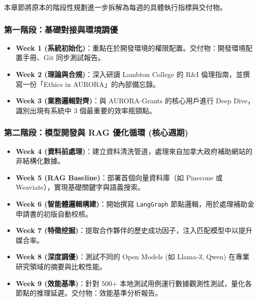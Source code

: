 \documentclass[12pt,a4paper]{article}
\begin{document}
本章節將原本的階段性規劃進一步拆解為每週的具體執行指標與交付物。

\subsubsection{第一階段：基礎對接與環境調優}
\begin{itemize}
    \item \textbf{Week 1 (系統初始化)}：重點在於開發環境的權限配置。交付物：開發環境配置手冊、Git 同步測試報告。
    \item \textbf{Week 2 (理論與合規)}：深入研讀 Lambton College 的 R\&I 倫理指南，並撰寫一份「Ethics in AURORA」的內部備忘錄。
    \item \textbf{Week 3 (業務邏輯對齊)}：與 AURORA-Grants 的核心用戶進行 Deep Dive，識別出現有系統中 3 個最重要的效率瓶頸點。
\end{itemize}

\newpage

\subsubsection{第二階段：模型開發與 RAG 優化循環 (核心週期)}
\begin{itemize}
    \item \textbf{Week 4 (資料前處理)}：建立資料清洗管道，處理來自加拿大政府補助網站的非結構化數據。
    \item \textbf{Week 5 (RAG Baseline)}：部署首個向量資料庫（如 Pinecone 或 Weaviate），實現基礎關鍵字與語義搜索。
    \item \textbf{Week 6 (智能體邏輯構建)}：開始撰寫 \texttt{LangGraph} 節點邏輯，用於處理補助金申請書的初版自動校核。
    \item \textbf{Week 7 (特徵挖掘)}：提取合作夥伴的歷史成功因子，注入匹配模型中以提升媒合率。
    \item \textbf{Week 8 (深度調優)}：測試不同的 Open Models (如 Llama-3, Qwen) 在專業研究領域的摘要與比較性能。
    \item \textbf{Week 9 (效能基準)}：針對 500+ 本地測試用例運行數據觀測性測試，量化各節點的推理延遲。交付物：效能基準分析報告。
\end{itemize}

\newpage
\end{document}
